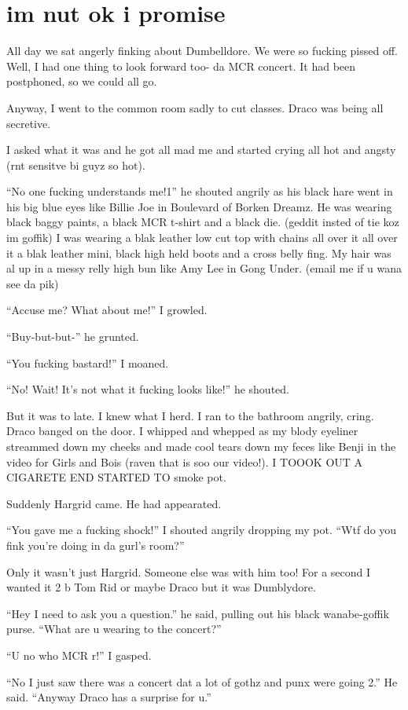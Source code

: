 \section{im nut ok i promise}


\XXX{\Xfill 666\Xfill}

All day we sat angerly finking about Dumbelldore. We were so fucking pissed off. Well, I had one thing to look forward too- da MCR concert. It had been postphoned, so we could all go.

Anyway, I went to the common room sadly to cut classes. Draco was being all secretive.

I asked what it was and he got all mad me and started crying all hot and angsty (rnt sensitve bi guyz so hot).

\enquote{No one fucking understands me!1} he shouted angrily as his black hare went in his big blue eyes like Billie Joe in Boulevard of Borken Dreamz. He was wearing black baggy paints, a black MCR t-shirt and a black die. (geddit insted of tie koz im goffik) I was wearing a blak leather low cut top with chains all over it all over it a blak leather mini, black high held boots and a cross belly fing. My hair was al up in a messy relly high bun like Amy Lee in Gong Under. (email me if u wana see da pik)

\enquote{Accuse me? What about me!} I growled.

\enquote{Buy-but-but-} he grunted.

\enquote{You fucking bastard!} I moaned.

\enquote{No! Wait! It's not what it fucking looks like!} he shouted.

But it was to late. I knew what I herd. I ran to the bathroom angrily, cring. Draco banged on the door. I whipped and whepped as my blody eyeliner streammed down my cheeks and made cool tears down my feces like Benji in the video for Girls and Bois (raven that is soo our video!). I TOOOK OUT A CIGARETE END STARTED TO smoke pot.

Suddenly Hargrid came. He had appearated.

\enquote{You gave me a fucking shock!} I shouted angrily dropping my pot. \enquote{Wtf do you fink you're doing in da gurl's room?}

Only it wasn't just Hargrid. Someone else was with him too! For a second I wanted it 2 b Tom Rid or maybe Draco but it was Dumblydore.

\enquote{Hey I need to ask you a question.} he said, pulling out his black wanabe-goffik purse. \enquote{What are u wearing to the concert?}

\enquote{U no who MCR r!} I gasped.

\enquote{No I just saw there was a concert dat a lot of gothz and punx were going 2.} He said. \enquote{Anyway Draco has a surprise for u.}

